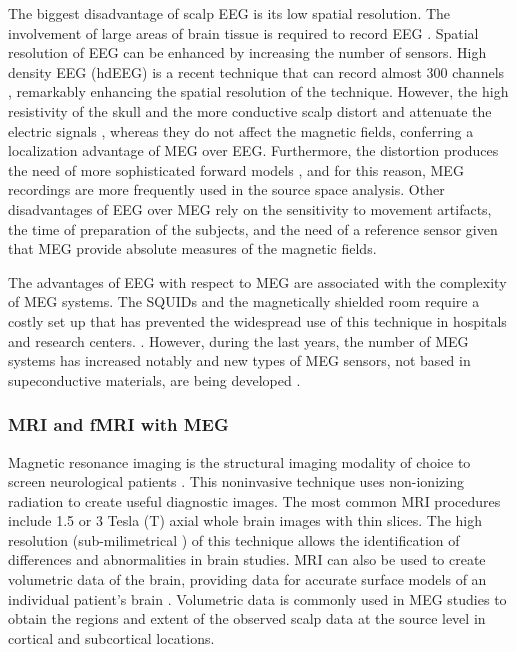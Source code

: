 The biggest disadvantage of scalp EEG is its low spatial resolution. The involvement of large areas of brain tissue is required to record EEG \citep{Falco-Walter2017}. Spatial resolution of EEG can be enhanced by increasing the number of sensors. High density EEG (hdEEG) is a recent technique that can record almost 300 channels \citep{Klamer2015}, remarkably enhancing the spatial resolution of the technique. However, the high resistivity of the skull and the more conductive scalp distort and attenuate the electric signals \citep{Cuffin1979}, whereas they do not affect the magnetic fields, conferring a localization advantage of MEG over EEG. Furthermore, the distortion produces the need of more sophisticated forward models \citep{Klamer2015}, and for this reason, MEG recordings are more frequently used in the source space analysis. Other disadvantages of EEG over MEG rely on the sensitivity to movement artifacts, the time of preparation of the subjects, and the need of a reference sensor \citep{Sharon2007} given that MEG provide absolute measures of the magnetic fields. 

The advantages of EEG with respect to MEG are associated with the complexity of MEG systems. The SQUIDs and the magnetically shielded room require a costly set up that has prevented the widespread use of this technique in hospitals and research centers. \citep{Sternickel2006}. However, during the last years, the number of MEG systems has increased notably and new types of MEG sensors, not based in supeconductive materials, are being developed \citep{Boto2017}.  

		\subsubsection*{MRI and fMRI with MEG}
		
Magnetic resonance imaging is the structural imaging modality of choice to screen neurological patients \citep{Assad2015}. This noninvasive technique uses non-ionizing radiation to create useful diagnostic images. The most common MRI procedures include 1.5 or 3 Tesla (T) axial whole brain images with thin slices. The high resolution (sub-milimetrical ) of this technique allows the identification of differences and abnormalities in brain studies. MRI can also be used to create volumetric data of the brain, providing data for accurate surface models of an individual patient's brain \citep{Xu1999}. Volumetric data is commonly used in MEG studies to obtain the regions and extent of the observed scalp data at the source level in cortical and subcortical locations. 
	
